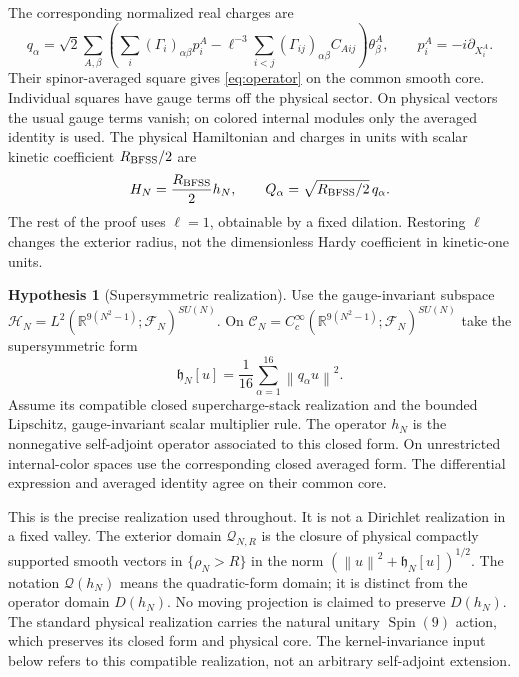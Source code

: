 \documentclass[11pt,letterpaper]{article}
\theoremstyle{definition}\newtheorem{hypothesis}[theorem]{Hypothesis}
\newcommand{\hh}{\mathfrak h}
\newcommand{\QQ}{\mathcal Q}
\newcommand{\FF}{\mathcal F}
\newcommand{\norm}[1]{\left\lVert #1\right\rVert}
\numberwithin{equation}{section}
\begin{document}
The corresponding normalized real charges are
\begin{equation}
 q_\alpha=\sqrt2\sum_{A,\beta}
 \left(\sum_i(\Gamma_i)_{\alpha\beta}p_i^A
   -\ell^{-3}\sum_{i<j}(\Gamma_{ij})_{\alpha\beta}C_{Aij}\right)
 \theta^A_\beta,\qquad p_i^A=-i\partial_{X_i^A}.\label{eq:charges}
\end{equation}
Their spinor-averaged square gives \eqref{eq:operator} on the common smooth core. Individual squares have gauge terms off the physical sector. On physical vectors the usual gauge terms vanish; on colored internal modules only the averaged identity is used. The physical Hamiltonian and charges in units with scalar kinetic coefficient $R_{\rm BFSS}/2$ are
\begin{equation}
 H_N=\frac{R_{\rm BFSS}}2 h_N,
 \qquad Q_\alpha=\sqrt{R_{\rm BFSS}/2}\,q_\alpha.
\end{equation}
The rest of the proof uses $\ell=1$, obtainable by a fixed dilation. Restoring $\ell$ changes the exterior radius, not the dimensionless Hardy coefficient in kinetic-one units.

\begin{hypothesis}[Supersymmetric realization]\label{hyp:realization}
Use the gauge-invariant subspace
$\mathscr H_N=L^2(\mathbb R^{9(N^2-1)};\FF_N)^{SU(N)}$.
On $\mathscr C_N=C_c^\infty(\mathbb R^{9(N^2-1)};\FF_N)^{SU(N)}$ take the supersymmetric form
\begin{equation}
 \hh_N[u]=\frac1{16}\sum_{\alpha=1}^{16}\norm{q_\alpha u}^2.
\end{equation}
Assume its compatible closed supercharge-stack realization and the bounded Lipschitz, gauge-invariant scalar multiplier rule. The operator $h_N$ is the nonnegative self-adjoint operator associated to this closed form. On unrestricted internal-color spaces use the corresponding closed averaged form. The differential expression and averaged identity agree on their common core.
\end{hypothesis}
This is the precise realization used throughout. It is not a Dirichlet realization in a fixed valley. The exterior domain $\QQ_{N,R}$ is the closure of physical compactly supported smooth vectors in $\{\rho_N>R\}$ in the norm $(\norm{u}^2+\hh_N[u])^{1/2}$.
The notation $\QQ(h_N)$ means the quadratic-form domain; it is distinct from the operator domain $D(h_N)$. No moving projection is claimed to preserve $D(h_N)$. The standard physical realization carries the natural unitary $\operatorname{Spin}(9)$ action, which preserves its closed form and physical core. The kernel-invariance input below refers to this compatible realization, not an arbitrary self-adjoint extension.
\end{document}
